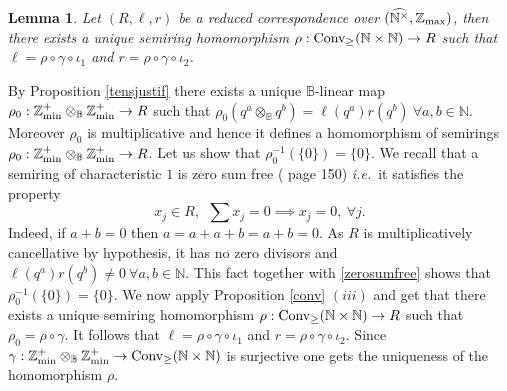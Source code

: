 \documentclass[noams,lp]{compositio}
\newtheorem{lem}[thm]{Lemma}
\def\B{{\mathbb B}}
\def\N{{\mathbb N}}
\def\Z{{\mathbb Z}}
\def\conv{{\rm Conv}_\geq}
\newcommand{\ie}{{\it i.e.\/}\ }
\def\zmin{\Z_{\rm min}}
\def\mc{multiplicatively cancellative }
\def\zmax{{\Z_{\rm max}}}
\def\arith{{(\wnt,\bar \N)}}
\def\wnt{{\widehat{\N^{\times}}}}
\def\nboplus{{\zmin^+\otimes_\B \zmin^+}}
\def\arith{{(\wnt,\zmax)}}
\begin{document}
\begin{lem}\label{lemcor} Let $(R,\ell,r)$ be a reduced correspondence over $\arith$, then there exists a unique semiring homomorphism $\rho:\conv(\N\times \N)\to R$ such that $\ell=\rho\circ \gamma\circ \iota_1$ and $r=\rho\circ \gamma\circ \iota_2$.
\end{lem}
\proof By Proposition \ref{tensjustif} there exists a unique $\B$-linear map $\rho_0:\nboplus\to R$ such that 
$
\rho_0(q^a\otimes_\B q^b)=\ell(q^a)r(q^b)\ \forall a,b \in \N.
$
Moreover $\rho_0$ is multiplicative and hence it defines a homomorphism of semirings $\rho_0:\nboplus\to R$.  Let us show that $\rho_0^{-1}(\{0\})=\{0\}$. We recall that a semiring of characteristic $1$ is zero sum free
(\!\!\cite{Golan} page 150) \ie it satisfies the property 
\begin{equation}\label{zerosumfree}
x_j\in R,  \ \   \sum x_j=0\implies x_j=0,\  \forall j.
\end{equation}
Indeed, if $a+b=0$ then $a=a+a+b=a+b=0$. As $R$ is \mc by hypothesis, it has no zero divisors and $\ell(q^a)r(q^b)\neq 0\  \forall a,b \in \N$. This fact together with \eqref{zerosumfree} shows that $\rho_0^{-1}(\{0\})=\{0\}$.
We now apply Proposition \ref{conv} $(iii)$ and get that there exists a unique semiring homomorphism $\rho:\conv(\N\times \N)\to R$ such that $\rho_0=\rho\circ \gamma$. It follows  that $\ell=\rho\circ \gamma\circ \iota_1$ and $r=\rho\circ \gamma\circ \iota_2$. Since $\gamma:\nboplus\to\conv(\N\times \N)$ is surjective one gets the uniqueness of the homomorphism $\rho$. \endproof
\end{document}
